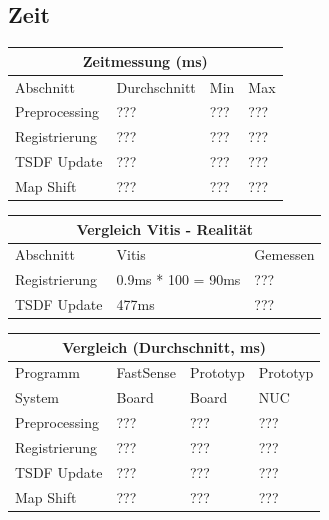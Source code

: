 \documentclass{beamer}
\begin{document}
\subsection{Zeit}
\begin{frame}{\subsecname}
\centering
\begin{tabular}{ |p{3cm}||p{2cm}|p{2cm}|p{2cm}|  }
 \hline
 \multicolumn{4}{|c|}{Zeitmessung (ms)} \\
 \hline
 Abschnitt      & Durchschnitt & Min & Max\\
 \hline
 Preprocessing  &          ??? & ??? & ??? \\
 Registrierung  &          ??? & ??? & ??? \\
 TSDF Update    &          ??? & ??? & ??? \\
 Map Shift      &          ??? & ??? & ??? \\
 \hline
\end{tabular}
\end{frame}

\begin{frame}
\centering
\begin{tabular}{ |l||l|l|  }
 \hline
 \multicolumn{3}{|c|}{Vergleich Vitis - Realität} \\
 \hline
 Abschnitt      & Vitis & Gemessen\\
 \hline
 Registrierung  & 0.9ms * 100 = 90ms & ??? \\
 TSDF Update    & 477ms & ??? \\
 \hline
\end{tabular}
\end{frame}

\begin{frame}{\subsecname}
\centering
\begin{tabular}{ |p{3cm}||p{2cm}|p{2cm}|p{2cm}|  }
 \hline
 \multicolumn{4}{|c|}{Vergleich (Durchschnitt, ms)} \\
 \hline
 Programm       & FastSense & Prototyp & Prototyp \\
 \hline
 System         &     Board &    Board &      NUC \\
 \hline
 Preprocessing  &       ??? &      ??? &      ??? \\
 Registrierung  &       ??? &      ??? &      ??? \\
 TSDF Update    &       ??? &      ??? &      ??? \\
 Map Shift      &       ??? &      ??? &      ??? \\
 \hline
\end{tabular}
\end{frame}
\end{document}
